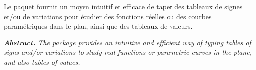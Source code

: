 \documentclass[12pt, a4paper]{article}
\begin{document}
\noindent
Le paquet  fournit un moyen intuitif et efficace de taper des tableaux de signes et/ou de variations pour étudier des fonctions réelles ou des courbes paramétriques dans le plan, ainsi que des tableaux de valeurs.




\tdocsep

{\noindent
\small\itshape
\textbf{Abstract.}
The  package provides an intuitive and efficient way of typing tables of signs and/or variations to study real functions or parametric curves in the plane, and also tables of values.
}
\end{document}
